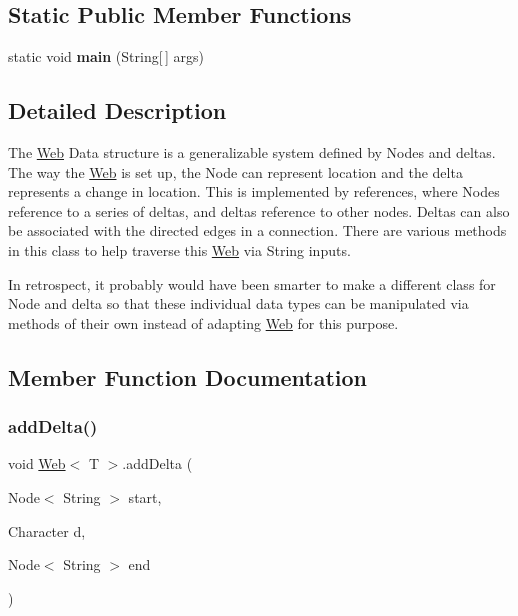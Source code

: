 \subsection*{Static Public Member Functions}
\begin{DoxyCompactItemize}
\item 
\mbox{\label{class_web_a90a7dd4e17ae18066eb78ab2eae143f8}} 
static void {\bfseries main} (String\mbox{[}$\,$\mbox{]} args)
\end{DoxyCompactItemize}


\subsection{Detailed Description}
The \mbox{\hyperlink{class_web}{Web}} Data structure is a generalizable system defined by Nodes and deltas. The way the \mbox{\hyperlink{class_web}{Web}} is set up, the Node can represent location and the delta represents a change in location. This is implemented by references, where Nodes reference to a series of deltas, and deltas reference to other nodes. Deltas can also be associated with the directed edges in a connection. There are various methods in this class to help traverse this \mbox{\hyperlink{class_web}{Web}} via String inputs.

In retrospect, it probably would have been smarter to make a different class for Node and delta so that these individual data types can be manipulated via methods of their own instead of adapting \mbox{\hyperlink{class_web}{Web}} for this purpose. 

\subsection{Member Function Documentation}
\mbox{\label{class_web_a5bccfa9eddb9815feccc8d0bd8cdb083}} 
\subsubsection{\texorpdfstring{addDelta()}{addDelta()}}
{\footnotesize\ttfamily void \mbox{\hyperlink{class_web}{Web}}$<$ T $>$.add\+Delta (\begin{DoxyParamCaption}\item[{Node$<$ String $>$}]{start,  }\item[{Character}]{d,  }\item[{Node$<$ String $>$}]{end }\end{DoxyParamCaption})\hspace{0.3cm}{\ttfamily [inline]}}

